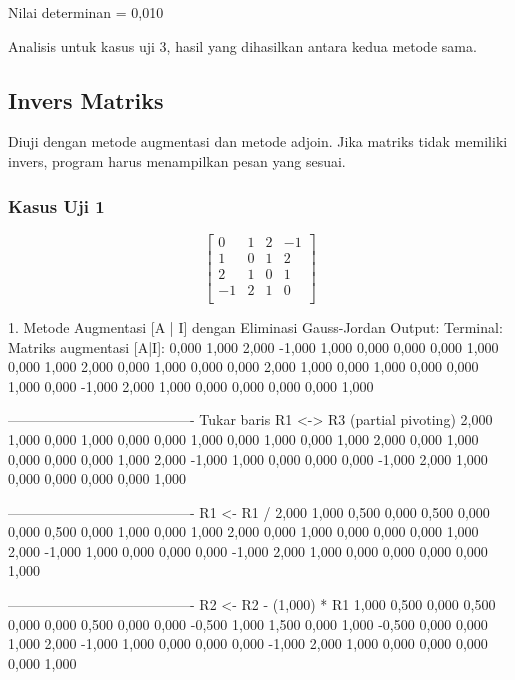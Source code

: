 \documentclass[12pt]{article}
\begin{document}
\begin{enumerate}
\begin{keluaran}
Nilai determinan = 0,010
\end{keluaran}
Analisis untuk kasus uji 3, hasil yang dihasilkan antara kedua metode sama.

\subsection{Invers Matriks}
Diuji dengan metode augmentasi dan metode adjoin. Jika matriks tidak memiliki
invers, program harus menampilkan pesan yang sesuai.
\subsubsection{Kasus Uji 1}
\begin{equation}
    \begin{bmatrix}
        0 & 1 & 2 & -1 \\
        1 & 0 & 1 & 2 \\
        2 & 1 & 0 & 1 \\
        -1 & 2 & 1 & 0 \\
    \end{bmatrix}
\end{equation}
\begin{keluaran}
1. Metode Augmentasi [A | I] dengan Eliminasi Gauss-Jordan
Output:
Terminal:
Matriks augmentasi [A|I]:
0,000   1,000   2,000   -1,000  1,000   0,000   0,000   0,000
1,000   0,000   1,000   2,000   0,000   1,000   0,000   0,000
2,000   1,000   0,000   1,000   0,000   0,000   1,000   0,000
-1,000  2,000   1,000   0,000   0,000   0,000   0,000   1,000

----------------------------------------
Tukar baris R1 <-> R3 (partial pivoting)
2,000   1,000   0,000   1,000   0,000   0,000   1,000   0,000
1,000   0,000   1,000   2,000   0,000   1,000   0,000   0,000
0,000   1,000   2,000   -1,000  1,000   0,000   0,000   0,000
-1,000  2,000   1,000   0,000   0,000   0,000   0,000   1,000

----------------------------------------
R1 <- R1 / 2,000
1,000   0,500   0,000   0,500   0,000   0,000   0,500   0,000
1,000   0,000   1,000   2,000   0,000   1,000   0,000   0,000
0,000   1,000   2,000   -1,000  1,000   0,000   0,000   0,000
-1,000  2,000   1,000   0,000   0,000   0,000   0,000   1,000

----------------------------------------
R2 <- R2 - (1,000) * R1
1,000   0,500   0,000   0,500   0,000   0,000   0,500   0,000
0,000   -0,500  1,000   1,500   0,000   1,000   -0,500  0,000
0,000   1,000   2,000   -1,000  1,000   0,000   0,000   0,000
-1,000  2,000   1,000   0,000   0,000   0,000   0,000   1,000


\end{keluaran}
\end{enumerate}
\end{document}
